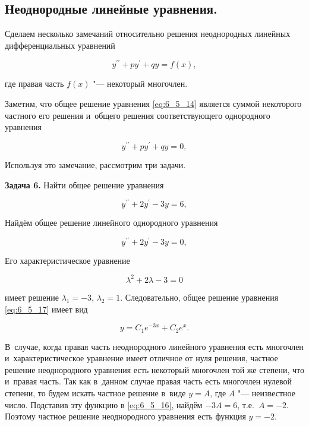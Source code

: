 \subsection{Неоднородные линейные уравнения.}

Сделаем несколько замечаний относительно решения неоднородных линейных
дифференциальных уравнений

\begin{equation}\label{eq:6_5_14}
y^{\prime\prime} + py^\prime + qy = f(x),
\end{equation}

\noindent
где правая часть $f(x)$ "--- некоторый многочлен.

Заметим, что общее решение уравнения \eqref{eq:6_5_14} является суммой
некоторого частного его решения и~общего решения соответствующего однородного
уравнения

\begin{equation}\label{eq:6_5_15}
y^{\prime\prime} + py^\prime + qy = 0,
\end{equation}

\noindent
Используя это замечание, рассмотрим три задачи.

\textbf{Задача 6.}\label{ex:6_5_6} Найти общее решение уравнения

\begin{equation}\label{eq:6_5_16}
y^{\prime\prime} + 2y^\prime - 3y = 6,
\end{equation}

\noindent
Найдём общее решение линейного однородного уравнения

\begin{equation}\label{eq:6_5_17}
y^{\prime\prime} + 2y^\prime - 3y = 0,
\end{equation}

\noindent
Его характеристическое уравнение

\begin{equation}\label{eq:6_5_17}
\lambda^{2} + 2\lambda - 3 = 0
\end{equation}

\noindent
имеет решение $\lambda_{1} = -3$, $\lambda_{2} = 1$.
Следовательно, общее решение уравнения \eqref{eq:6_5_17} имеет вид

\begin{equation}
y = C_{1}e^{-3x} + C_{2}e^{x}.
\end{equation}

\noindent
В~случае, когда правая часть неоднородного линейного уравнения есть многочлен
и~характеристическое уравнение имеет отличное от нуля решения, частное решение
неоднородного уравнения есть некоторый многочлен той же степени, что и~правая часть.
Так как в~данном случае правая часть есть многочлен нулевой степени,
то будем искать частное решение в~виде $y = A$, где $A$ "--- неизвестное число.
Подставив эту функцию в \eqref{eq:6_5_16}, найдём $-3A = 6$, т.е.\ $A = -2$.
Поэтому частное решение неоднородного уравнения есть функция $y = -2$.

